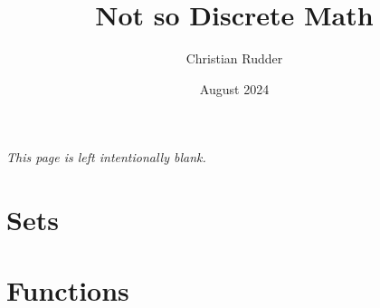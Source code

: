 \documentclass{article}
\title{Not so Discrete Math}
\author{Christian Rudder}
\date{August 2024}
\begin{document}
\maketitle

\tableofcontents

\newpage
\thispagestyle{empty}
\mbox{}
\vfill
\begin{center}
    \textit{This page is left intentionally blank.}
\end{center}
\vfill
\newpage

\section{Sets}


\vspace{1em}


\section{Functions}

\end{document}

